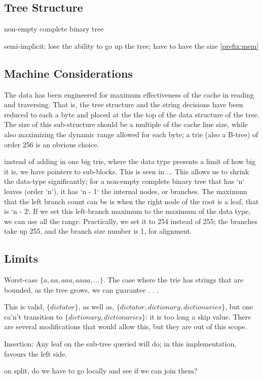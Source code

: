 \documentclass[12pt]{article}
\begin{document}
\subsection{Tree Structure}

non-empty complete binary tree

semi-implicit: lose the ability to go up the tree; have to have the size \ref{prefix:mem}

\subsection{Machine Considerations}

The data has been engineered for maximum effectiveness of the cache in reading and traversing. That is, the tree structure and the string decisions have been reduced to each a byte and placed at the the top of the data structure of the tree. The size of this sub-structure should be a multiple of the cache line size, while also maximizing the dynamic range allowed for each byte; a trie (also a B-tree) of order 256 is an obvious choice.

instead of adding in one big trie, where the data type presents a limit of how big it is, we have pointers to sub-blocks. This is seen in ... This allows us to shrink the data-type significantly; for a non-empty complete binary tree that has `n` leaves (order `n`), it has `n - 1` the internal nodes, or branches. The maximum that the left branch count can be is when the right node of the root is a leaf, that is `n - 2`. If we set this left-branch maximum to the maximum of the data type, we can use all the range. Practically, we set it to 254 instead of 255; the branches take up 255, and the branch size number is 1, for alignment.

\subsection{Limits}

Worst-case $\{ a, aa, aaa, aaaa, ... \}$. The case where the trie has strings that are bounded, as the tree grows, we can guarantee . . .

This is valid, $\{ dictator \}$, as well as, $\{ dictator, dictionary, dictionaries \}$, but one ca'n't transition to $\{ dictionary, dictionaries \}$: it is too long a skip value. There are several modifications that would allow this, but they are out of this scope.

Insertion: Any leaf on the sub-tree queried will do; in this implementation, favours the left side.

on split, do we have to go locally and see if we can join them?


\end{document}
